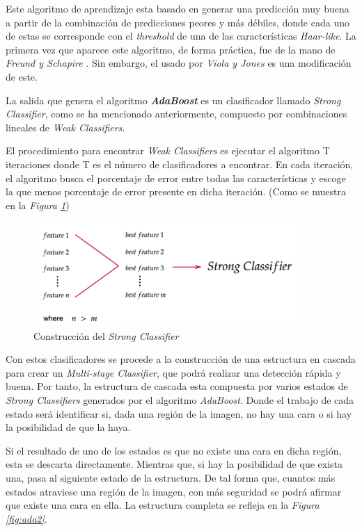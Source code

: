 Este algoritmo de aprendizaje esta basado en generar una predicción muy buena a partir de la combinación de predicciones peores y más débiles, donde cada uno de estas se corresponde con el \textit{threshold} de una de las características \textit{Haar-like}. La primera vez que aparece este algoritmo, de forma práctica, fue de la mano de \textit{Freund y Schapire} \cite{adaboost1}. Sin embargo, el usado por \textit{Viola y Jones} es una modificación de este.

La salida que genera el algoritmo \textbf{\textit{AdaBoost}} es un clasificador llamado \textit{Strong Classifier}, como se ha mencionado anteriormente, compuesto por combinaciones lineales de \textit{Weak Classifiers}. 

El procedimiento para encontrar \textit{Weak Classifiers} es ejecutar el algoritmo T iteraciones donde T es el número de clasificadores a encontrar. En cada iteración, el algoritmo busca el porcentaje de error entre todas las características y escoge la que menos porcentaje de error presente en dicha iteración. (Como se muestra en la \textit{Figura \ref{fig:ada1}}) \cite{adaboost2}

\begin{figure}[htp]
	\centering
	\includegraphics[width=10cm]{imagenes/ada1.png}
	\caption{Construcción del \textit{Strong Classifier}}
	\label{fig:ada1}
\end{figure}

Con estos clasificadores se procede a la construcción de una estructura en cascada para crear un \textit{Multi-stage Classifier}, que podrá realizar una detección rápida y buena. Por tanto, la estructura de cascada esta compuesta por varios estados de \textit{Strong Classifiers} generados por el algoritmo \textit{AdaBoost}. Donde el trabajo de cada estado será identificar si, dada una región de la imagen, no hay una cara o si hay la posibilidad de que la haya. \cite{adaboost1}

Si el resultado de uno de los estados es que no existe una cara en dicha región, esta se descarta directamente. Mientras que, si hay la posibilidad de que exista una, pasa al siguiente estado de la estructura. De tal forma que, cuantos más estados atraviese una región de la imagen, con más seguridad se podrá afirmar que existe una cara en ella. La estructura completa se refleja en la \textit{Figura \ref{fig:ada2}}.

